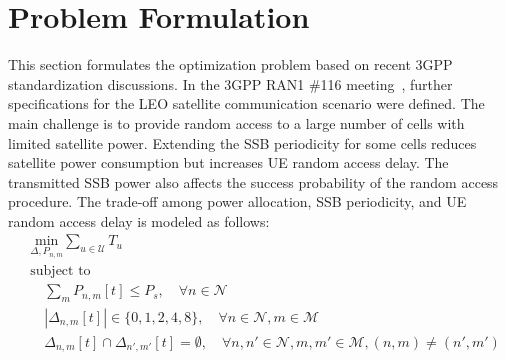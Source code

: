 \section{Problem Formulation}
This section formulates the optimization problem based on recent 3GPP standardization discussions. In the 3GPP RAN1 \#116 meeting~\cite{ran1-116}, further specifications for the LEO satellite communication scenario were defined. The main challenge is to provide random access to a large number of cells with limited satellite power. Extending the SSB periodicity for some cells reduces satellite power consumption but increases UE random access delay. The transmitted SSB power also affects the success probability of the random access procedure. The trade-off among power allocation, SSB periodicity, and UE random access delay is modeled as follows:
\begin{equation}
\begin{aligned}
    & \underset{\Delta, P_{n, m}}{\text{min}} \sum_{u \in \mathcal{U}} T_u \\
    & \text{subject to} \\
    & \quad \sum_{m} P_{n,m}[t] \leq P_s, \quad \forall n \in \mathcal{N} \\
    & \quad |\Delta_{n, m}[t]| \in \{0, 1, 2, 4, 8\}, \quad \forall n \in \mathcal{N}, m \in \mathcal{M} \\
    & \quad \Delta_{n, m}[t] \cap \Delta_{n', m'}[t] = \emptyset, \quad \forall n, n' \in \mathcal{N}, m, m' \in \mathcal{M}, (n, m) \neq (n', m')
\end{aligned}
\end{equation}

